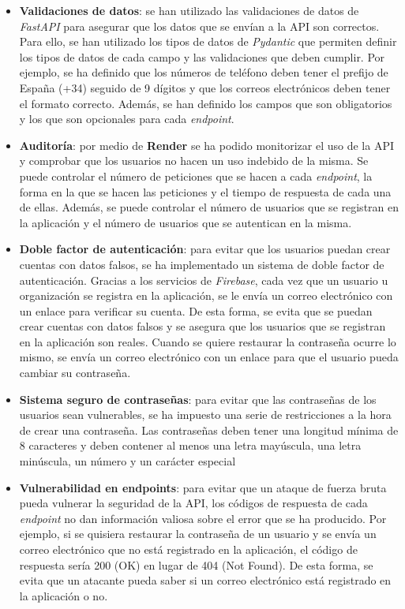 \begin{itemize}
    \item \textbf{Validaciones de datos}: se han utilizado las validaciones de datos de \textit{FastAPI} para asegurar que los datos
    que se envían a la API son correctos. Para ello, se han utilizado los tipos de datos de \textit{Pydantic} que permiten
    definir los tipos de datos de cada campo y las validaciones que deben cumplir. Por ejemplo, se ha definido que
    los números de teléfono deben tener el prefijo de España (+34) seguido de 9 dígitos y que los correos electrónicos deben tener el formato
    correcto. Además, se han definido los campos que son obligatorios y los que son opcionales para cada \textit{endpoint}.
    \item \textbf{Auditoría}: por medio de \textbf{Render} se ha podido monitorizar el uso de la API y comprobar que los usuarios
    no hacen un uso indebido de la misma. Se puede controlar el número de peticiones que se hacen a cada \textit{endpoint},
    la forma en la que se hacen las peticiones y el tiempo de respuesta de cada una de ellas. Además, se puede controlar
    el número de usuarios que se registran en la aplicación y el número de usuarios que se autentican en la misma.
    \item \textbf{Doble factor de autenticación}: para evitar que los usuarios puedan crear cuentas con datos falsos, se ha
    implementado un sistema de doble factor de autenticación. Gracias a los servicios de \textit{Firebase}, cada vez que
    un usuario u organización se registra en la aplicación, se le envía un correo electrónico con un enlace para verificar
    su cuenta. De esta forma, se evita que se puedan crear cuentas con datos falsos y se asegura que los usuarios
    que se registran en la aplicación son reales. Cuando se quiere restaurar la contraseña ocurre lo mismo, se envía
    un correo electrónico con un enlace para que el usuario pueda cambiar su contraseña.
    \item \textbf{Sistema seguro de contraseñas}: para evitar que las contraseñas de los usuarios sean vulnerables, se ha
    impuesto una serie de restricciones a la hora de crear una contraseña. Las contraseñas deben tener una longitud mínima
    de 8 caracteres y deben contener al menos una letra mayúscula, una letra minúscula, un número y un carácter especial
    \item \textbf{Vulnerabilidad en endpoints}: para evitar que un ataque de fuerza bruta pueda vulnerar la seguridad de la API,
    los códigos de respuesta de cada \textit{endpoint} no dan información valiosa sobre el error que se ha producido. Por ejemplo,
    si se quisiera restaurar la contraseña de un usuario y se envía un correo electrónico que no está registrado en la
    aplicación, el código de respuesta sería 200 (OK) en lugar de 404 (Not Found). De esta forma, se evita que un atacante
    pueda saber si un correo electrónico está registrado en la aplicación o no.
\end{itemize}

